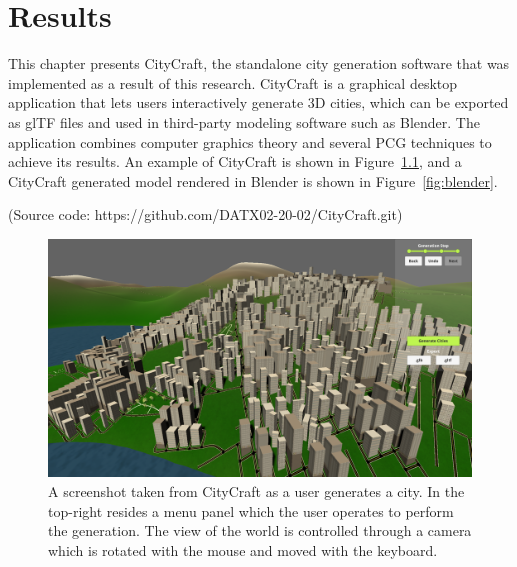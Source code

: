 \chapter{Results}

This chapter presents CityCraft, the standalone city generation software that was implemented as a result of this research.
CityCraft is a graphical desktop application that lets users interactively generate 3D cities, which can be exported as glTF files and used in third-party modeling software such as Blender.
The application combines computer graphics theory and several PCG techniques to achieve its results.
An example of CityCraft is shown in Figure~\ref{fig:screenshot}, and a CityCraft generated model rendered in Blender is shown in Figure~\ref{fig:blender}.

(Source code:  https://github.com/DATX02-20-02/CityCraft.git)

\begin{figure}[H]
  \centering
  \includegraphics[width=\textwidth]{figure/results/screenshot.png}

  \caption{A screenshot taken from CityCraft as a user generates a city. In the top-right resides a menu panel which the user operates to perform the generation. The view of the world is controlled through a camera which is rotated with the mouse and moved with the keyboard.}
  \label{fig:screenshot}
\end{figure}

